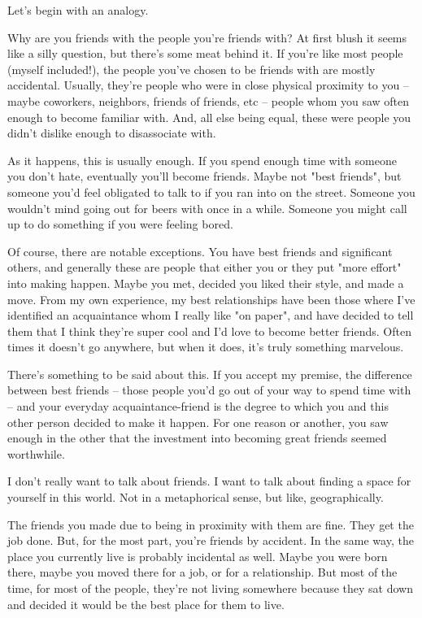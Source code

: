 \documentclass[]{book}
\begin{document}
Let's begin with an analogy.

Why are you friends with the people you're friends with? At first blush it seems
like a silly question, but there's some meat behind it. If you're like most
people (myself included!), the people you've chosen to be friends with are
mostly accidental. Usually, they're people who were in close physical proximity
to you -- maybe coworkers, neighbors, friends of friends, etc -- people whom you
saw often enough to become familiar with. And, all else being equal, these were
people you didn't dislike enough to disassociate with.

As it happens, this is usually enough. If you spend enough time with someone you
don't hate, eventually you'll become friends. Maybe not "best friends", but
someone you'd feel obligated to talk to if you ran into on the street. Someone
you wouldn't mind going out for beers with once in a while. Someone you might
call up to do something if you were feeling bored.

Of course, there are notable exceptions. You have best friends and significant
others, and generally these are people that either you or they put "more effort"
into making happen. Maybe you met, decided you liked their style, and made a
move. From my own experience, my best relationships have been those where I've
identified an acquaintance whom I really like "on paper", and have decided to
tell them that I think they're super cool and I'd love to become better friends.
Often times it doesn't go anywhere, but when it does, it's truly something
marvelous.


There's something to be said about this. If you accept my premise, the
difference between best friends -- those people you'd go out of your way to
spend time with -- and your everyday acquaintance-friend is the degree to which
you and this other person decided to make it happen. For one reason or another,
you saw enough in the other that the investment into becoming great friends
seemed worthwhile.

I don't really want to talk about friends. I want to talk about finding a space
for yourself in this world. Not in a metaphorical sense, but like,
geographically.

The friends you made due to being in proximity with them are fine. They get the
job done. But, for the most part, you're friends by accident. In the same way,
the place you currently live is probably incidental as well. Maybe you were born
there, maybe you moved there for a job, or for a relationship. But most of the
time, for most of the people, they're not living somewhere because they sat down
and decided it would be the best place for them to live.
\end{document}
